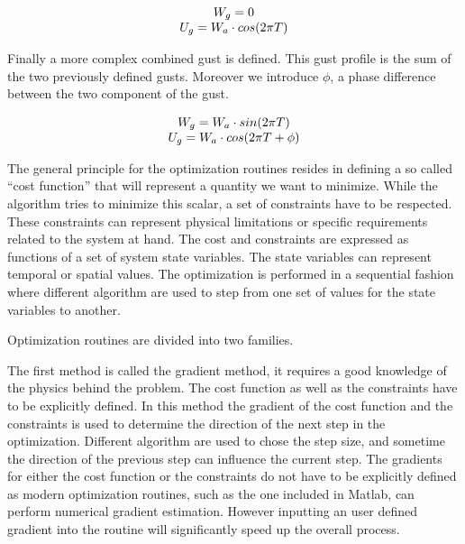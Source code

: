 \begin{equation}
\begin{array}[c]{c}
  W_g = 0 \\
  U_g = W_a \cdot cos(2 \pi T)
\end{array}
\label{eqn:horizontal_gust_definition}
\end{equation}

\par Finally a more complex combined gust is defined.
This gust profile is the sum of the two previously defined gusts.
Moreover we introduce $\phi$, a phase difference between the two component of the gust. 

\begin{equation}
\begin{array}[c]{c}
  W_g = W_a \cdot sin(2\pi T) \\
  U_g = W_a \cdot cos(2 \pi T + \phi)
\end{array}
\label{eqn:combined_gust_definition}
\end{equation}


The general principle for the optimization routines resides in defining a so called ``cost function'' that will represent a quantity we want to minimize.
While the algorithm tries to minimize this scalar, a set of constraints have to be respected. 
These constraints can represent physical limitations or specific requirements related to the system at hand.
The cost and constraints are expressed as functions of a set of system state variables.
The state variables can represent temporal or spatial values.
The optimization is performed in a sequential fashion where different algorithm are used to step from one set of values for the state variables to another. 

\par Optimization routines are divided into two families. 

\par The first method is called the gradient method, it requires a good knowledge of the physics behind the problem.
The cost function as well as the constraints have to be explicitly defined.
In this method the gradient of the cost function and the constraints is used to determine the direction of the next step in the optimization.
Different algorithm are used to chose the step size, and sometime the direction of the previous step can influence the current step.
The gradients for either the cost function or the constraints do not have to be explicitly defined as modern optimization routines, such as the one included in Matlab, can perform numerical gradient estimation.
However inputting an user defined gradient into the routine will significantly speed up the overall process.

